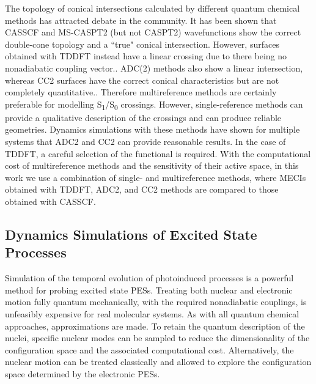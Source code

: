 The topology of conical intersections calculated by different quantum chemical methods has attracted debate in the community.\cite{Levine2006a,Gozem2014,Tuna2015,Lefrancois2017} It has been shown that CASSCF and MS-CASPT2 (but not CASPT2) wavefunctions show the correct double-cone topology and a ``true" conical intersection. However, surfaces obtained with \ac{TDDFT} instead have a linear crossing due to there being no nonadiabatic coupling vector.\cite{Gozem2014}. ADC(2) methods also show a linear intersection, whereas \ac{CC}2 surfaces have the correct conical characteristics but are not completely quantitative.\cite{Tuna2015}. Therefore multireference methods are certainly preferable for modelling S\textsubscript{1}/S\textsubscript{0} crossings. However, single-reference methods can provide a qualitative description of the crossings and can produce reliable geometries. Dynamics simulations with these methods have shown for multiple systems that ADC2 and CC2 can provide reasonable results.\cite{Gozem2014,Tuna2015} In the case of TDDFT, a careful selection of the functional is required.\cite{Crespo-Otero2014,Barbatti2015} With the computational cost of multireference methods and the sensitivity of their active space, in this work we use a combination of single- and multireference methods, where \acp{MECI} obtained with \ac{TDDFT}, \ac{ADC2}, and \ac{CC}2 methods are compared to those obtained with CASSCF.

\subsection{Dynamics Simulations of Excited State Processes}\label{section: photo_dynamics}
Simulation of the temporal evolution of photoinduced processes is a powerful method for probing excited state \acp{PES}. Treating both nuclear and electronic motion fully quantum mechanically, with the required nonadiabatic couplings, is unfeasibly expensive for real molecular systems. As with all quantum chemical approaches, approximations are made. To retain the quantum description of the nuclei, specific nuclear modes can be sampled to reduce the dimensionality of the configuration space and the associated computational cost. Alternatively, the nuclear motion can be treated classically and allowed to explore the configuration space determined by the electronic \acp{PES}. 

